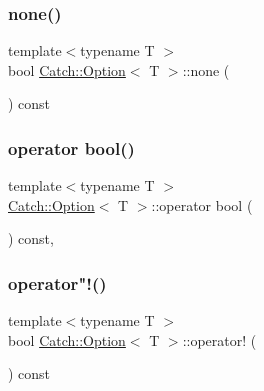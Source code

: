 \subsubsection{\texorpdfstring{none()}{none()}}
{\footnotesize\ttfamily template$<$typename T $>$ \\
bool \mbox{\hyperlink{class_catch_1_1_option}{Catch\+::\+Option}}$<$ T $>$\+::none (\begin{DoxyParamCaption}{ }\end{DoxyParamCaption}) const\hspace{0.3cm}{\ttfamily [inline]}}

\mbox{\label{class_catch_1_1_option_aba0def0bd9cd45d4e00fe47a604b0270}} 
\subsubsection{\texorpdfstring{operator bool()}{operator bool()}}
{\footnotesize\ttfamily template$<$typename T $>$ \\
\mbox{\hyperlink{class_catch_1_1_option}{Catch\+::\+Option}}$<$ T $>$\+::operator bool (\begin{DoxyParamCaption}{ }\end{DoxyParamCaption}) const\hspace{0.3cm}{\ttfamily [inline]}, {\ttfamily [explicit]}}

\mbox{\label{class_catch_1_1_option_a96dccb86bdf45ee0c08e122b6133bef3}} 
\subsubsection{\texorpdfstring{operator"!()}{operator!()}}
{\footnotesize\ttfamily template$<$typename T $>$ \\
bool \mbox{\hyperlink{class_catch_1_1_option}{Catch\+::\+Option}}$<$ T $>$\+::operator! (\begin{DoxyParamCaption}{ }\end{DoxyParamCaption}) const\hspace{0.3cm}{\ttfamily [inline]}}

\mbox{\label{class_catch_1_1_option_afd989852fa453731c3190dac63caccb0}} 

